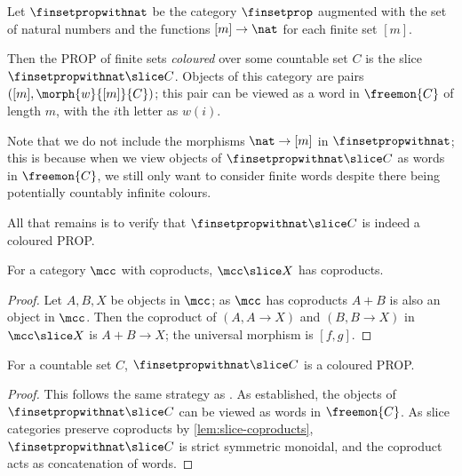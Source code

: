 \begin{definition}
    Let \(\finsetpropwithnat\) be the category \(\finsetprop\) augmented with the
    set of natural numbers and the functions \([m] \to \nat\) for each finite
    set \([m]\).
\end{definition}

Then the PROP of finite sets \emph{coloured} over some countable set \(C\) is
the slice \(\finsetpropwithnat \slice C\).
Objects of this category are pairs \(([m], \morph{w}{[m]}{C})\); this pair can
be viewed as a word in \(\freemon{C}\) of length \(m\), with the \(i\)th letter
as \(w(i)\).

\begin{remark}
    Note that we do not include the morphisms \(\nat \to [m]\) in
    \(\finsetpropwithnat\); this is because when we view objects of
    \(\finsetpropwithnat \slice C\) as words in \(\freemon{C}\), we still only
    want to consider finite words despite there being potentially countably
    infinite colours.
\end{remark}

All that remains is to verify that \(\finsetpropwithnat \slice C\) is indeed a
coloured PROP.

\begin{lemma}
    \label{lem:slice-coproducts}
    For a category \(\mcc\) with coproducts, \(\mcc \slice X\) has coproducts.
\end{lemma}
\begin{proof}
    Let \(A,B,X\) be objects in \(\mcc\); as \(\mcc\) has coproducts \(A + B\)
    is also an object in \(\mcc\).
    Then the coproduct of \((A, A \to X)\) and \((B, B \to X)\) in
    \(\mcc \slice X\) is \(A + B \to X\); the universal morphism is \([f, g]\).
\end{proof}

\begin{proposition}
    \label{prop:hatfinsetprop-slice-is-coloured-prop}
    For a countable set \(C\), \(\finsetpropwithnat \slice C\) is a
    coloured PROP.
\end{proposition}
\begin{proof}
    This follows the same strategy as \cite[Prop. 2.23]{bonchi2022string}.
    As established, the objects of \(\finsetpropwithnat \slice C\) can be viewed
    as words in \(\freemon{C}\).
    As slice categories preserve coproducts by \cref{lem:slice-coproducts},
    \(\finsetpropwithnat \slice C\) is strict symmetric monoidal, and the
    coproduct acts as concatenation of words.
\end{proof}

